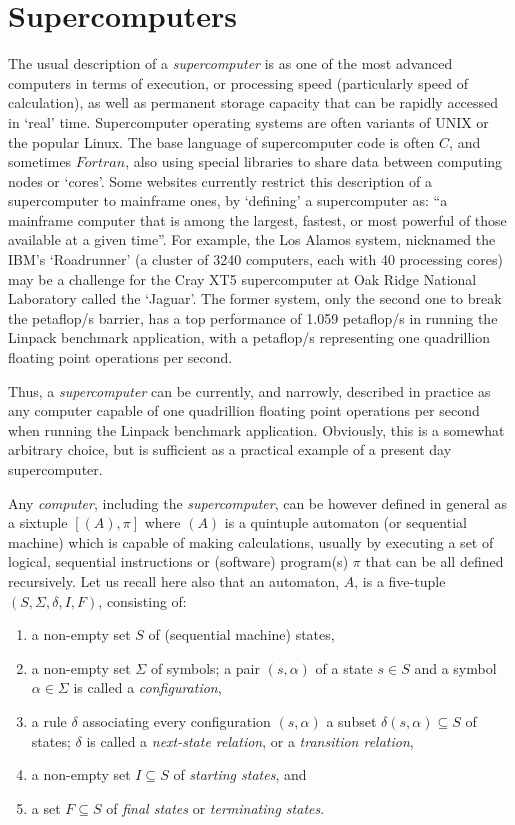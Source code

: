 \documentclass[12pt]{article}
\theoremstyle{plain}
\theoremstyle{definition}
\numberwithin{equation}{section}
\begin{document}
\section{Supercomputers}

 The usual description of a \emph{supercomputer} is as one of the most advanced computers in terms of execution, or processing speed (particularly speed of calculation), as well as permanent storage capacity that can be rapidly accessed in `real' time. Supercomputer operating systems are often variants of UNIX or the popular Linux. The base language of supercomputer code is often $C$, and sometimes $Fortran$, also using special libraries to share data between computing nodes or `cores'. Some websites currently restrict this description of a supercomputer to mainframe ones, by `defining' a supercomputer as: ``a mainframe computer that is among the largest, fastest, or most powerful of those available at a given time''. For example, the Los Alamos system, nicknamed the IBM's `Roadrunner' (a cluster of 3240 computers, each with 40 processing cores) may be a challenge for the Cray XT5 supercomputer at Oak Ridge National Laboratory called the `Jaguar'. The former system, only the second one to break the petaflop/s barrier, has a top performance of 1.059 petaflop/s in running the Linpack benchmark application, with a  petaflop/s representing one quadrillion floating point operations per second. 

  Thus, a \emph{supercomputer} can be currently, and narrowly, described in practice as any computer capable of one quadrillion floating point operations per second when running the Linpack benchmark application. Obviously, this is a somewhat arbitrary choice, but is sufficient as a practical example of a present day supercomputer. 

 Any \emph{computer}, including the \emph{supercomputer}, can be however defined in general as a sixtuple $[(A),\pi]$ where $(A)$ is a quintuple automaton (or sequential machine) which is capable of making calculations, usually by executing a set of logical, sequential instructions or (software) program(s) $\pi$ that can be all defined recursively. Let us recall here also that an automaton, $A$, is a five-tuple $(S,\Sigma,\delta,I,F)$, consisting of:
\begin{enumerate}
\item
a non-empty set $S$ of (sequential machine) states,
\item
a non-empty set $\Sigma$ of symbols; a pair $(s,\alpha)$ of a state $s\in S$ and a symbol $\alpha \in\Sigma$ is called a \emph{configuration},
\item
a rule $\delta$ associating every configuration $(s,\alpha)$ a subset $\delta(s,\alpha)\subseteq S$ of states; $\delta$ is called a \emph{next-state relation}, or a \emph{transition relation},
\item
a non-empty set $I\subseteq S$ of \emph{starting states}, and
\item
a set $F\subseteq S$ of \emph{final states} or \emph{terminating states}.
\end{enumerate}
\end{document}
